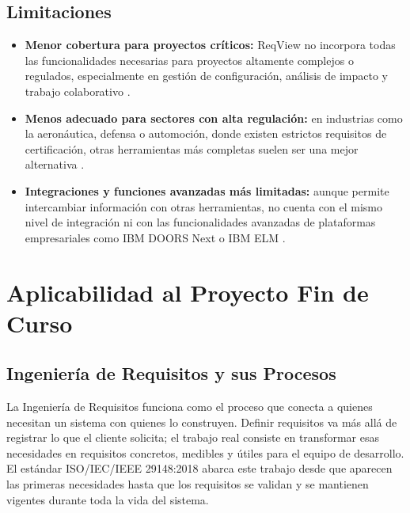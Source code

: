 \documentclass[journal,onecolumn]{IEEEtran}
\begin{document}
\subsection{Limitaciones}

\begin{itemize}
	\item \textbf{Menor cobertura para proyectos críticos:} ReqView no incorpora todas
	las funcionalidades necesarias para proyectos altamente complejos o regulados,
	especialmente en gestión de configuración, análisis de impacto y trabajo
	colaborativo \cite{khoroshilov2019}.

	\item \textbf{Menos adecuado para sectores con alta regulación:} en industrias como
	la aeronáutica, defensa o automoción, donde existen estrictos requisitos de
	certificación, otras herramientas más completas suelen ser una mejor alternativa
	\cite{khoroshilov2019}.

	\item \textbf{Integraciones y funciones avanzadas más limitadas:} aunque permite
	intercambiar información con otras herramientas, no cuenta con el mismo nivel de
	integración ni con las funcionalidades avanzadas de plataformas empresariales como
	IBM DOORS Next o IBM ELM \cite{khoroshilov2019}.
\end{itemize}


\section{Aplicabilidad al Proyecto Fin de Curso}

\subsection{Ingeniería de Requisitos y sus Procesos}

La Ingeniería de Requisitos funciona como el proceso que conecta a quienes necesitan un sistema
con quienes lo construyen. Definir requisitos va más allá de registrar lo que el cliente solicita;
el trabajo real consiste en transformar esas necesidades en requisitos concretos, medibles y útiles
para el equipo de desarrollo. El estándar ISO/IEC/IEEE 29148:2018 \cite{iso29148} abarca este
trabajo desde que aparecen las primeras necesidades hasta que los requisitos se validan y se
mantienen vigentes durante toda la vida del sistema.
\end{document}
